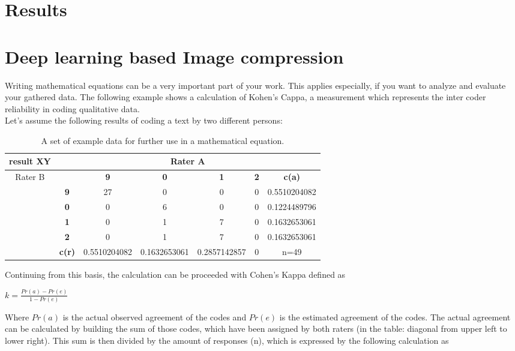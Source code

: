 \section{Results}


\newpage
\section{Deep learning based Image compression }

Writing mathematical equations can be a very important part of your work. This applies especially, if you want to analyze and evaluate your gathered data. The following example shows a calculation of Kohen's Cappa, a measurement which represents the inter coder reliability in coding qualitative data.\\

Let's assume the following results of coding a text by two different persons:

\begin{table}[H]
\begin{center}
\begin{tabular}{|c|c|c|c|c|c|c|}
\hline
result XY & \multicolumn{6}{c|}{Rater A}\\\hline
 \multirow{6}{*}{Rater B}& & \textbf{9} & \textbf{0} & \textbf{1} & \textbf{2} & \textbf{c(a) }\\\cline{2-7}
 & \textbf{9}& 27	&0&	0	&0 & 0.5510204082\\\cline{2-7}
&\textbf{0}	&0	&6	&0	&0&0.1224489796\\\cline{2-7}
&\textbf{1}	&0	&1	&7	&0&0.1632653061\\\cline{2-7}
&\textbf{2}	&0	&1	&7	&0&0.1632653061\\\cline{2-7}
&\textbf{c(r)} & 0.5510204082 & 0.1632653061 & 0.2857142857 & 0& n=49\\\hline

\end{tabular}
\caption[Example data for mathematical equations]{A set of example data for further use in a mathematical equation.  }
\end{center}
\end{table}

Continuing from this basis, the calculation can be proceeded with Cohen's Kappa defined as

\begin{center}
$k=\frac{Pr(a) - Pr(e)}{1 - Pr(e)}$
\end{center}

Where $Pr(a)$ is the actual observed agreement of the codes and $Pr(e)$ is the estimated agreement of the codes. The actual agreement can be calculated by building the sum of those codes, which have been assigned by both raters (in the table: diagonal from upper left to lower right). This sum is then divided by the amount of responses (n), which is expressed by the following calculation as 

